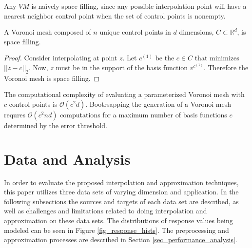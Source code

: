 Any $VM$ is na\"{\i}vely space filling, since any possible interpolation point will have a nearest neighbor control point when the set of control points is nonempty.

\begin{theorem}
  A Voronoi mesh composed of $n$ unique control points in $d$ dimensions, $C \subset \mathbb{R}^d$, is space filling.
\end{theorem}
\begin{proof}
  Consider interpolating at point $z$. Let $c^{(1)}$ be the $c \in C$ that minimizes $||z-c||_2$. Now, $z$ must be in the support of the basis function $v^{c^{(1)}}$. Therefore the Voronoi mesh is space filling.
\end{proof}

The computational complexity of evaluating a parameterized Voronoi mesh with $c$ control points is $\mathcal{O}(c^2 d)$. Bootrsapping the generation of a Voronoi mesh requres $\mathcal{O}(c^2 n d)$ computations for a maximum number of basis functions $c$ determined by the error threshold.


\section{Data and Analysis}
In order to evaluate the proposed interpolation and approximation techniques, this paper utilizes three data sets of varying dimension and application. In the following subsections the sources and targets of each data set are described, as well as challenges and limitations related to doing interpolation and approximation on these data sets. The distributions of response values being modeled can be seen in Figure \ref{fig_response_hists}. The preprocessing and approximation processes are described in Section \ref{sec_performance_analysis}.


